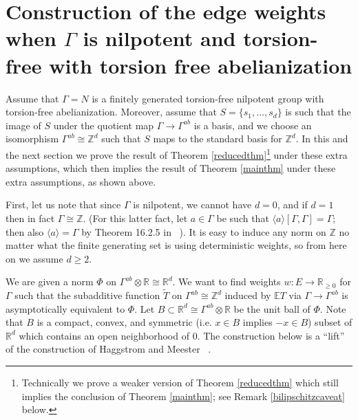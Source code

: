 \documentclass[12pt,reqno]{article}
\numberwithin{equation}{section}
\newcommand{\R}{\mathbb{R}}
\newcommand{\E}{\mathbb{E}}
\newcommand{\Z}{\mathbb{Z}}
\begin{document}
 
 
 
 
 
 
 
 
 \section{Construction of the edge weights when $\Gamma$ is nilpotent and torsion-free with torsion free abelianization} \label{easyconstruction}
 Assume that $\Gamma = N$ is a finitely generated torsion-free nilpotent group with torsion-free abelianization.
 Moreover, assume that $S=\{s_1,...,s_d\}$ is such that the image of $S$ under the quotient map $\Gamma \to \Gamma^{ab}$
 is a basis, and we choose an isomorphism $\Gamma^{ab} \cong \Z^d$ such that $S$ maps to the standard basis for $\Z^d$. In this 
 and the next section we prove the result of Theorem \ref{reducedthm}\footnote{Technically we prove a weaker version of Theorem
 \ref{reducedthm} which still implies the conclusion of Theorem \ref{mainthm}; see Remark \ref{bilipschitzcaveat} below.}
  under these extra assumptions, which then implies the result
 of Theorem \ref{mainthm} under these extra assumptions, as shown above.
 


 First, let us note that since $\Gamma$ is nilpotent, we cannot have $d=0$,
 and if $d=1$ then in fact $\Gamma \cong \Z$. (For this latter fact, let $a \in \Gamma$ be such that 
 $\langle a \rangle [\Gamma, \Gamma] = \Gamma$; then also $\langle a \rangle = \Gamma$ by Theorem 16.2.5
 in ~\cite{KarMer}). It is easy to induce any norm on $\Z$ no matter what the finite generating set is using deterministic weights,
 so from here on we assume $d \ge 2$. 
 
 We are given a norm $\Phi$ on $\Gamma^{ab} \otimes \R \cong \R^d$. We want to find weights $w:E \to \R_{\ge 0}$ for $\Gamma$
 such that the subadditive function $\tilde{T}$ on $\Gamma^{ab} \cong \Z^d$ induced by $\E T$ via $\Gamma \to \Gamma^{ab}$ is
 asymptotically equivalent to $\Phi$. Let $B \subset \R^d \cong \Gamma^{ab} \otimes \R$ be the unit ball of $\Phi$. 
 Note that $B$ is a compact, convex, and symmetric (i.e. $x \in B$ implies $-x \in B$) subset
 of $\R^d$ which contains an open neighborhood of $0$. The construction below is a ``lift'' of the construction of 
 Haggstrom and Meester ~\cite{HaggstromMeester}.
 
\end{document}
